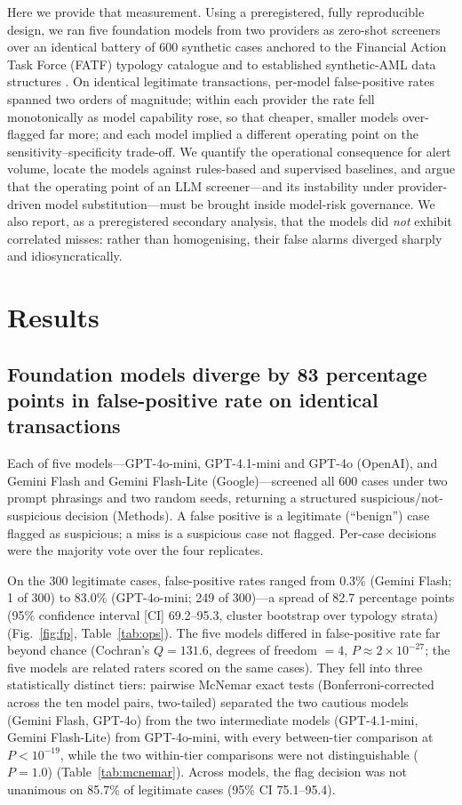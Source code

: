 \documentclass[lineno,pdflatex,sn-basic,Numbered]{sn-jnl}
\begin{document}
Here we provide that measurement. Using a preregistered, fully reproducible design, we ran five foundation models from two providers as zero-shot screeners over an identical battery of 600 synthetic cases anchored to the Financial Action Task Force (FATF) typology catalogue and to established synthetic-AML data structures \cite{samld,amlsim}. On identical legitimate transactions, per-model false-positive rates spanned two orders of magnitude; within each provider the rate fell monotonically as model capability rose, so that cheaper, smaller models over-flagged far more; and each model implied a different operating point on the sensitivity--specificity trade-off. We quantify the operational consequence for alert volume, locate the models against rules-based and supervised baselines, and argue that the operating point of an LLM screener---and its instability under provider-driven model substitution---must be brought inside model-risk governance. We also report, as a preregistered secondary analysis, that the models did \emph{not} exhibit correlated misses: rather than homogenising, their false alarms diverged sharply and idiosyncratically.

\section{Results}\label{sec:results}

\subsection{Foundation models diverge by 83 percentage points in false-positive rate on identical transactions}\label{sec:fpspread}

Each of five models---GPT-4o-mini, GPT-4.1-mini and GPT-4o (OpenAI), and Gemini Flash and Gemini Flash-Lite (Google)---screened all 600 cases under two prompt phrasings and two random seeds, returning a structured suspicious/not-suspicious decision (Methods). A false positive is a legitimate (``benign'') case flagged as suspicious; a miss is a suspicious case not flagged. Per-case decisions were the majority vote over the four replicates.

On the 300 legitimate cases, false-positive rates ranged from 0.3\% (Gemini Flash; 1 of 300) to 83.0\% (GPT-4o-mini; 249 of 300)---a spread of 82.7 percentage points (95\% confidence interval [CI] 69.2--95.3, cluster bootstrap over typology strata) (Fig.~\ref{fig:fp}, Table~\ref{tab:ops}). The five models differed in false-positive rate far beyond chance (Cochran's $Q = 131.6$, degrees of freedom $= 4$, $P \approx 2\times10^{-27}$; the five models are related raters scored on the same cases). They fell into three statistically distinct tiers: pairwise McNemar exact tests (Bonferroni-corrected across the ten model pairs, two-tailed) separated the two cautious models (Gemini Flash, GPT-4o) from the two intermediate models (GPT-4.1-mini, Gemini Flash-Lite) from GPT-4o-mini, with every between-tier comparison at $P < 10^{-19}$, while the two within-tier comparisons were not distinguishable ($P = 1.0$) (Table~\ref{tab:mcnemar}). Across models, the flag decision was not unanimous on 85.7\% of legitimate cases (95\% CI 75.1--95.4).
\end{document}
